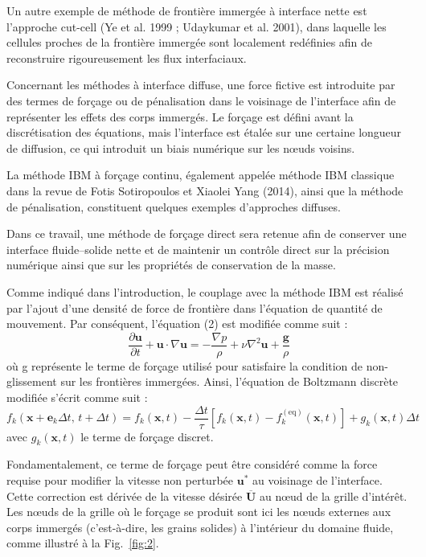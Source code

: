 \documentclass[12pt,a4paper]{report}
\begin{document}
Un autre exemple de méthode de frontière immergée à interface nette est l’approche cut-cell (Ye et al. 1999 ; Udaykumar et al. 2001), dans laquelle les cellules proches de la frontière immergée sont localement redéfinies afin de reconstruire rigoureusement les flux interfaciaux.

Concernant les méthodes à interface diffuse, une force fictive est introduite par des termes de forçage ou de pénalisation dans le voisinage de l’interface afin de représenter les effets des corps immergés. Le forçage est défini avant la discrétisation des équations, mais l’interface est étalée sur une certaine longueur de diffusion, ce qui introduit un biais numérique sur les nœuds voisins.

La méthode IBM à forçage continu, également appelée méthode IBM classique dans la revue de Fotis Sotiropoulos et Xiaolei Yang (2014), ainsi que la méthode de pénalisation, constituent quelques exemples d’approches diffuses.

Dans ce travail, une méthode de forçage direct sera retenue afin de conserver une interface fluide–solide nette et de maintenir un contrôle direct sur la précision numérique ainsi que sur les propriétés de conservation de la masse.

Comme indiqué dans l’introduction, le couplage avec la méthode IBM est réalisé par l’ajout d’une densité de force de frontière dans l’équation de quantité de mouvement. Par conséquent, l’équation (2) est modifiée comme suit :
\begin{equation}
\frac{\partial \mathbf{u}}{\partial t} + \mathbf{u}\cdot\nabla \mathbf{u}
=
-\frac{\nabla p}{\rho}
+
\nu \nabla^2 \mathbf{u}
+
\frac{\mathbf{g}}{\rho}
\end{equation}
où g représente le terme de forçage utilisé pour satisfaire la condition de non-glissement sur les frontières immergées. Ainsi, l’équation de Boltzmann discrète modifiée s’écrit comme suit :
\begin{equation}
f_k(\mathbf{x}+\mathbf{e}_k\Delta t,\, t+\Delta t)
=
f_k(\mathbf{x},t)
-
\frac{\Delta t}{\tau}
\left[
f_k(\mathbf{x},t)-f_k^{(\mathrm{eq})}(\mathbf{x},t)
\right]
+
g_k(\mathbf{x},t)\Delta t
\end{equation}
avec \( g_k(\mathbf{x}, t) \) le terme de forçage discret.

Fondamentalement, ce terme de forçage peut être considéré comme la force requise pour modifier 
la vitesse non perturbée \( \mathbf{u}^* \) au voisinage de l'interface. Cette correction 
est dérivée de la vitesse désirée \( \overline{\mathbf{U}} \) au nœud de la grille d'intérêt. 
Les nœuds de la grille où le forçage se produit sont ici les nœuds externes aux corps 
immergés (c'est-à-dire, les grains solides) à l'intérieur du domaine fluide, comme illustré 
à la Fig.~\ref{fig:2}.
\end{document}
